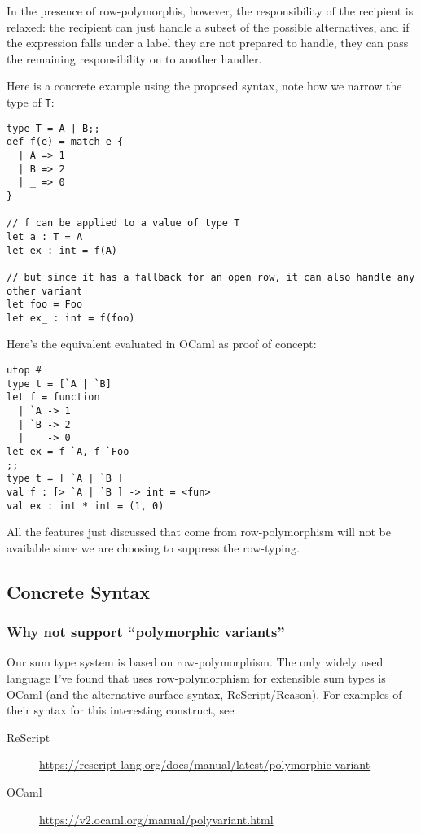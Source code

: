 \documentclass[11pt]{article}
\begin{document}
\begin{enumerate}
In the presence of row-polymorphis, however, the responsibility of the
recipient is relaxed: the recipient can just handle a subset of the
possible alternatives, and if the expression falls under a label they
are not prepared to handle, they can pass the remaining responsibility
on to another handler.

Here is a concrete example using the proposed syntax, note how we narrow
the type of \texttt{T}:

\begin{verbatim}
type T = A | B;;
def f(e) = match e {
  | A => 1
  | B => 2
  | _ => 0
}

// f can be applied to a value of type T
let a : T = A
let ex : int = f(A)

// but since it has a fallback for an open row, it can also handle any other variant
let foo = Foo
let ex_ : int = f(foo)
\end{verbatim}

Here's the equivalent evaluated in OCaml as proof of concept:

\begin{verbatim}
utop # 
type t = [`A | `B]
let f = function
  | `A -> 1
  | `B -> 2
  | _  -> 0
let ex = f `A, f `Foo
;;
type t = [ `A | `B ]
val f : [> `A | `B ] -> int = <fun>
val ex : int * int = (1, 0)
\end{verbatim}

All the features just discussed that come from row-polymorphism will not be
available since we are choosing to suppress the row-typing.
\end{enumerate}

\subsection{Concrete Syntax}
\label{sec:orgf128100}

\subsubsection{Why not support ``polymorphic variants''}
\label{sec:org7b76685}
Our sum type system is based on row-polymorphism. The only widely used language
I've found that uses row-polymorphism for extensible sum types is OCaml (and the
alternative surface syntax, ReScript/Reason). For examples of their syntax for
this interesting construct, see

\begin{description}
\item[{ReScript}] \url{https://rescript-lang.org/docs/manual/latest/polymorphic-variant}
\item[{OCaml}] \url{https://v2.ocaml.org/manual/polyvariant.html}
\end{description}
\end{document}
